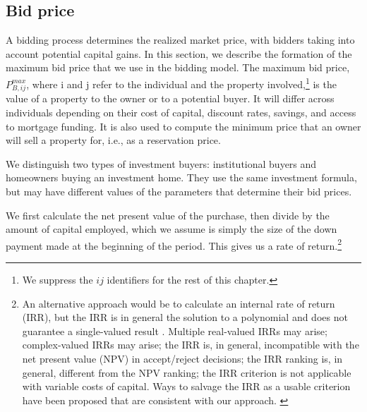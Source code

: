 {\subsection{Bid price}\label{sec:bid-price}
A bidding process determines the realized market price, with bidders taking into account potential capital gains. In this section, we describe the formation of the maximum bid price that we use  in the bidding model. The maximum bid price, $P_{B,ij}^{max}$, where i and j refer to the individual and the property involved,\footnote{We suppress the $ij$ identifiers for the rest of this chapter. }  is the value of a property to the owner or to a potential buyer. It will differ across individuals depending on their cost of capital, discount rates,  savings, and access to mortgage funding. It is also used to compute the minimum price that an owner will sell a property for,  i.e., as a reservation price. 

We distinguish two types of investment buyers: institutional buyers and homeowners buying an investment home. They use the same investment formula, but may have different values of the parameters that determine their bid prices.

We first calculate the net present value of the purchase, then divide by the amount of capital employed, which we assume is simply the size of the down payment made at the beginning of the period. This gives us a rate of return.\footnote{An alternative   approach would be to calculate an internal rate of return (IRR), but  the IRR is in general the solution to a polynomial and does not guarantee a single-valued result \cite{robinsonOptimalTerminationIRR1996}. 
Multiple real-valued  IRRs may arise;  complex-valued IRRs may arise;  the IRR is, in general, incompatible with the net present value (NPV) in accept/reject decisions; the IRR ranking is, in general, different from the NPV ranking; the IRR criterion is not applicable with variable costs of capital. Ways to salvage the IRR as a usable criterion have been proposed that are consistent with our approach. \cite{magniAverageInternalRate2010}} 


}
